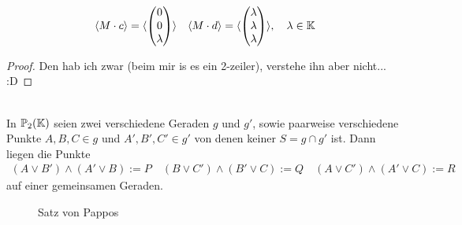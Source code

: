 \begin{thm} 
\begin{align*}
      \langle M \cdot c \rangle = \langle \begin{pmatrix} 0 \\ 0 \\ \lambda \end{pmatrix} \rangle \quad
      \langle M \cdot d \rangle = \langle \begin{pmatrix} \lambda \\ \lambda \\ \lambda  \end{pmatrix} \rangle, \quad \lambda \in \mathbb K
    \end{align*}
  \end{thm}

  \begin{proof}
    Den hab ich zwar (beim mir is es ein 2-zeiler), verstehe ihn aber nicht... :D
  \end{proof}

  \begin{thm} \ \\
    In $\mathbb{P}_2(\mathbb K)$ seien zwei verschiedene Geraden $g$ und $g'$, sowie paarweise verschiedene Punkte $A,B,C \in g$ und $A',B',C' \in g'$ von denen keiner 
    $S=g\cap g'$ ist. Dann liegen die Punkte
    \begin{align*}
      (A\vee B') \wedge (A'\vee B) := P \quad (B\vee C') \wedge (B'\vee C) := Q \quad (A\vee C') \wedge (A'\vee C) := R  
    \end{align*}
    auf einer gemeinsamen Geraden.
    
    
    \begin{figure}[h]
      
      \caption{Satz von Pappos}
    \end{figure}

  \end{thm}

